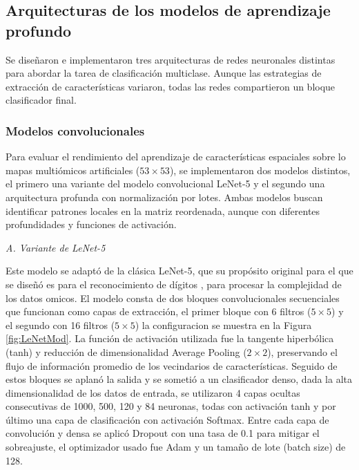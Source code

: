\documentclass[preprint,number]{elsarticle}
\begin{document}
\subsection{Arquitecturas de los modelos de aprendizaje profundo}

Se diseñaron e implementaron tres arquitecturas de redes neuronales distintas para abordar la tarea de clasificación multiclase. Aunque las estrategias de extracción de características variaron, todas las redes compartieron un bloque clasificador final.


\subsubsection{Modelos convolucionales}

Para evaluar el rendimiento del aprendizaje de características espaciales sobre lo mapas multiómicos artificiales ($53 \times 53$), se implementaron dos modelos distintos, el primero una variante del modelo convolucional LeNet-5 y el segundo una arquitectura profunda con normalización por lotes. Ambas modelos buscan identificar patrones locales en la matriz reordenada, aunque con diferentes profundidades y funciones de activación.

\textit{A. Variante de LeNet-5}

Este modelo se adaptó de la clásica LeNet-5, que su propósito original para el que se diseñó es para el reconocimiento de dígitos \cite{lecun2002gradient}, para procesar la complejidad de los datos omicos. El modelo consta de dos bloques convolucionales secuenciales que funcionan como capas de extracción, el primer bloque con 6 filtros ($5 \times 5$) y el segundo con 16 filtros ($5 \times 5$) la configuracion se muestra en la Figura \ref{fig:LeNetMod}. La función de activación utilizada fue la tangente hiperbólica (tanh) y reducción de dimensionalidad Average Pooling ($2 \times 2$), preservando el flujo de información promedio de los vecindarios de características. Seguido de estos bloques se aplanó la salida y se sometió a un clasificador denso, dada la alta dimensionalidad de los datos de entrada, se utilizaron 4 capas ocultas consecutivas de 1000, 500, 120 y 84 neuronas, todas con activación tanh y por último una capa de clasificación con activación Softmax. Entre cada capa de convolución y densa se aplicó Dropout con una tasa de 0.1 para mitigar el sobreajuste, el optimizador usado fue Adam y un tamaño de lote (batch size) de 128.
\end{document}
